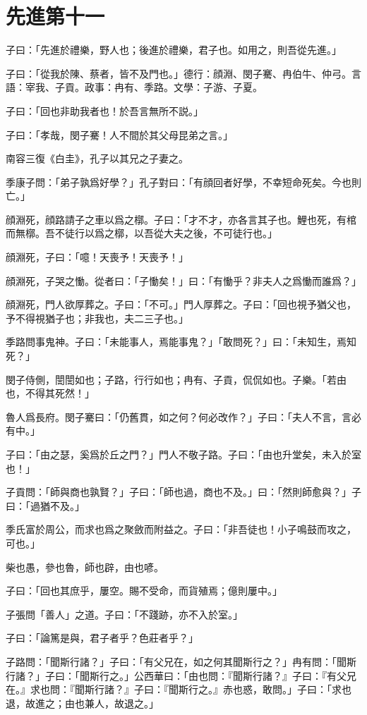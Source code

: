 \section[先進第十一]{先進第十一}

子曰：「先進於禮樂，野人也；後進於禮樂，君子也。如用之，則吾從先進。」

子曰：「從我於陳、蔡者，皆不及門也。」德行：顔淵、閔子騫、冉伯牛、仲弓。言語：宰我、子貢。政事：冉有、季路。文學：子游、子夏。

子曰：「回也非助我者也！於吾言無所不説。」

子曰：「孝哉，閔子騫！人不間於其父母昆弟之言。」

南容三復《白圭》，孔子以其兄之子妻之。

季康子問：「弟子孰爲好學？」孔子對曰：「有顔回者好學，不幸短命死矣。今也則亡。」

顔淵死，顔路請子之車以爲之槨。子曰：「才不才，亦各言其子也。鯉也死，有棺而無槨。吾不徒行以爲之槨，以吾從大夫之後，不可徒行也。」

顔淵死，子曰：「噫！天喪予！天喪予！」

顔淵死，子哭之慟。從者曰：「子慟矣！」曰：「有慟乎？非夫人之爲慟而誰爲？」

顔淵死，門人欲厚葬之。子曰：「不可。」門人厚葬之。子曰：「回也視予猶父也，予不得視猶子也；非我也，夫二三子也。」

季路問事鬼神。子曰：「未能事人，焉能事鬼？」「敢問死？」曰：「未知生，焉知死？」

閔子侍側，誾誾如也；子路，行行如也；冉有、子貢，侃侃如也。子樂。「若由也，不得其死然！」

魯人爲長府。閔子騫曰：「仍舊貫，如之何？何必改作？」子曰：「夫人不言，言必有中。」

子曰：「由之瑟，奚爲於丘之門？」門人不敬子路。子曰：「由也升堂矣，未入於室也！」

子貢問：「師與商也孰賢？」子曰：「師也過，商也不及。」曰：「然則師愈與？」子曰：「過猶不及。」

季氏富於周公，而求也爲之聚斂而附益之。子曰：「非吾徒也！小子鳴鼓而攻之，可也。」

柴也愚，參也魯，師也辟，由也喭。

子曰：「回也其庶乎，屢空。賜不受命，而貨殖焉；億則屢中。」

子張問「善人」之道。子曰：「不踐跡，亦不入於室。」

子曰：「論篤是與，君子者乎？色莊者乎？」

子路問：「聞斯行諸？」子曰：「有父兄在，如之何其聞斯行之？」冉有問：「聞斯行諸？」子曰：「聞斯行之。」公西華曰：「由也問：『聞斯行諸？』子曰：『有父兄在。』求也問：『聞斯行諸？』子曰：『聞斯行之。』赤也惑，敢問。」子曰：「求也退，故進之；由也兼人，故退之。」

